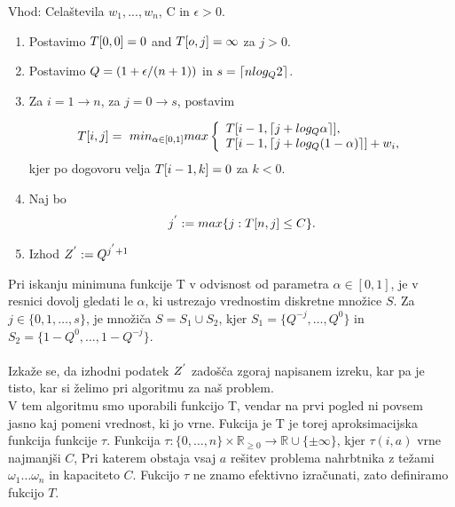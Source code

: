 \documentclass[a4paper,15pt]{article}
\begin{document}
\begin{framed}
Vhod: Celaštevila \(w_{1},...,w_{n}\), C in \( \epsilon > 0\).
\begin{enumerate}
\item Postavimo \(\uppercase{t}[0,0] = 0\) and \(\uppercase{t}[o,j] = \infty \) za \(j > 0\).
\item Postavimo \( \uppercase{q} = ( 1+ \epsilon/(n + 1))\) in \( s= \lceil n log_{\uppercase{q}}2 \rceil\).
\item Za \( i = 1 \to n\), za \( j = 0 \to s \), postavim

\[ 
\uppercase{t}[i, j]=\ min_{\alpha \in [0,1]} max \left\{
\begin{array}{ll}
      \uppercase{t}[i - 1, \lceil j + log_{\uppercase{q}}\alpha \rceil ], \\
      \uppercase{t}[i - 1, \lceil j + log_{\uppercase{q}}(1 - \alpha) \rceil ] + w_{i}, 
      
\end{array} 
\right. 
\]
kjer po dogovoru velja \( \uppercase{t}[i - 1, k] = 0 \) za \( k <0\).

\item Naj bo
\[
j^{'} := max\{j : \uppercase{t}[n, j] \leq \uppercase{C} \}.
\]
\item Izhod \(\uppercase{Z}^{'} := \uppercase{Q}^{j^{'} + 1} \)
\end{enumerate}
\end{framed}



\noindent Pri iskanju minimuna funkcije T v odvisnost od parametra $\alpha \in [0,1]$, je v resnici dovolj gledati le $\alpha$, ki ustrezajo vrednostim diskretne množice $S$. Za $ j \in \{0, 1, \ldots, s\}$, je množiča $S = S_{1} \cup S_{2}$, kjer $S_{1} = \{Q^{-j}, \ldots, Q^0\}$ in $S_{2} = \{1-Q^{0}, \ldots, 1- Q^{-j}\}$. \\
\vspace{3mm}\\
\noindent Izkaže se, da izhodni podatek \(\uppercase{z}^{'}\) zadošča zgoraj napisanem izreku, kar pa je tisto, kar si želimo pri algoritmu za naš problem.\\

\vspace{3mm}
\noindent V tem algoritmu smo uporabili funkcijo T, vendar na prvi pogled ni povsem jasno kaj pomeni vrednost, ki jo vrne. Fukcija  je T je torej aproksimacijska funkcija funkcije $\tau$.  Funkcija $\tau :  \{0, \ldots, n\} \times \mathbb{R}_{\geq 0}  \rightarrow \mathbb{R} \cup \{\pm \infty \} $, kjer $\tau (i,a )$ vrne najmanjši $C$, Pri katerem obstaja vsaj $a$ rešitev problema nahrbtnika z težami $ \omega_{1} \ldots \omega_{n}$ in kapaciteto $C$. Fukcijo $\tau$ ne znamo efektivno izračunati, zato definiramo fukcijo $T$. \\
 
\end{document}

